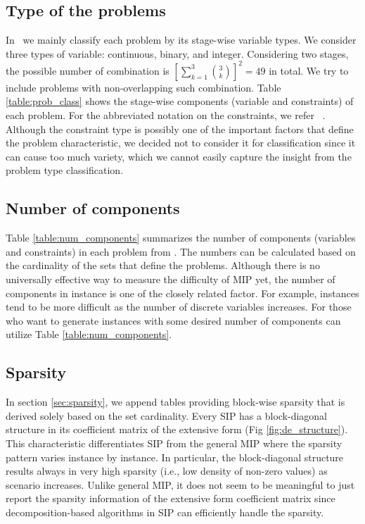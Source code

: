 \subsection{Type of the problems}
In \siplibtwo\, we mainly classify each problem by its stage-wise variable types. We consider three types of variable: continuous, binary, and integer. Considering two stages, the possible number of combination is $\left[\sum_{k=1}^3\binom{3}{k}\right]^2=49$ in total. We try to include problems with non-overlapping such combination. Table \ref{table:prob_class} shows the stage-wise components (variable and constraints) of each problem. For the abbreviated notation on the constraints, we refer \miplib\ \cite{MIPLIB}. Although the constraint type is possibly one of the important factors that define the problem characteristic, we decided not to consider it for classification since it can cause too much variety, which we cannot easily capture the insight from the problem type classification. 


\subsection{Number of components}
Table \ref{table:num_components} summarizes the number of components (variables and constraints) in each problem from \siplibtwo. The numbers can be calculated based on the cardinality of the sets that define the problems. Although there is no universally effective way to measure the difficulty of MIP yet, the number of components in instance is one of the closely related factor. For example, instances tend to be more difficult as the number of discrete variables increases. For those who want to generate instances with some desired number of components can utilize Table \ref{table:num_components}.



\subsection{Sparsity}
In section \ref{sec:sparsity}, we append tables providing block-wise sparsity that is derived solely based on the set cardinality. Every SIP has a block-diagonal structure in its coefficient matrix of the extensive form (Fig \ref{fig:de_structure}). This characteristic differentiates SIP from the general MIP where the sparsity pattern varies instance by instance. In particular, the block-diagonal structure results always in very high sparsity (i.e., low density of non-zero values) as scenario increases. Unlike general MIP, it does not seem to be meaningful to just report the sparsity information of the extensive form coefficient matrix since decomposition-based algorithms in SIP can efficiently handle the sparsity. 

